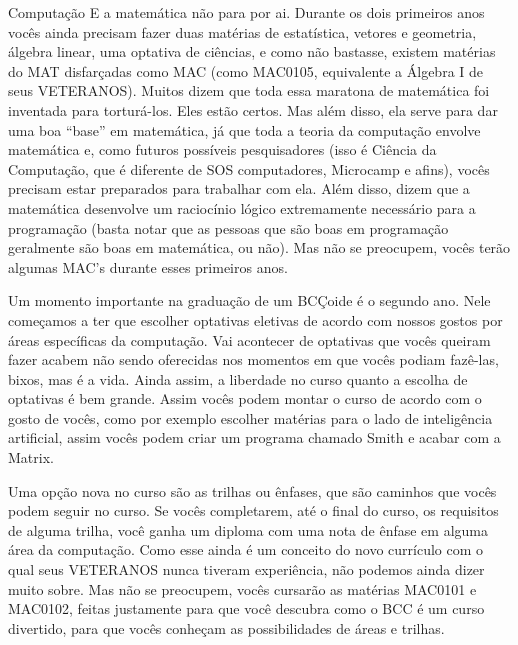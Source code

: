 \begin{subsecao}{Computação}
E a matemática não para por ai. Durante os dois primeiros anos vocês ainda
precisam fazer duas matérias de estatística, vetores e geometria, álgebra linear, uma
optativa de ciências, e como não bastasse, existem matérias do MAT disfarçadas
como MAC (como MAC0105, equivalente a Álgebra I de seus VETERANOS). Muitos dizem
que toda essa maratona de matemática foi inventada para torturá-los. Eles estão
certos. Mas além disso, ela serve para dar uma boa ``base'' em matemática, já
que toda a teoria da computação envolve matemática e, como futuros possíveis
pesquisadores (isso é Ciência da Computação, que é diferente de SOS
computadores, Microcamp e afins), vocês precisam estar preparados para trabalhar
com ela. Além disso, dizem que a matemática desenvolve um raciocínio lógico
extremamente necessário para a programação (basta notar que as pessoas que são
boas em programação geralmente são boas em matemática, ou não). Mas não se
preocupem, vocês terão algumas MAC's durante esses primeiros anos.

Um momento importante na graduação de um BCÇoide é o segundo ano. Nele começamos
a ter que escolher optativas eletivas de acordo com nossos gostos por áreas
específicas da computação. Vai acontecer de optativas que vocês queiram fazer
acabem não sendo oferecidas nos momentos em que vocês podiam fazê-las, bixos,
mas é a vida. Ainda assim, a liberdade no curso quanto a escolha de optativas é
bem grande. Assim vocês podem montar o curso de acordo com o gosto de vocês,
como por exemplo escolher matérias para o lado de inteligência artificial, assim
vocês podem criar um programa chamado Smith e acabar com a Matrix.

Uma opção nova no curso são as trilhas ou ênfases, que são caminhos que vocês
podem seguir no curso. Se vocês completarem, até o final do curso, os requisitos
de alguma trilha, você ganha um diploma com uma nota de ênfase em alguma área da
computação. Como esse ainda é um conceito do novo currículo com o qual seus
VETERANOS nunca tiveram experiência, não podemos ainda dizer muito sobre. Mas
não se preocupem, vocês cursarão as matérias MAC0101 e MAC0102, feitas
justamente para que você descubra como o BCC é um curso divertido, para que
vocês conheçam as possibilidades de áreas e trilhas.


\end{subsecao}
